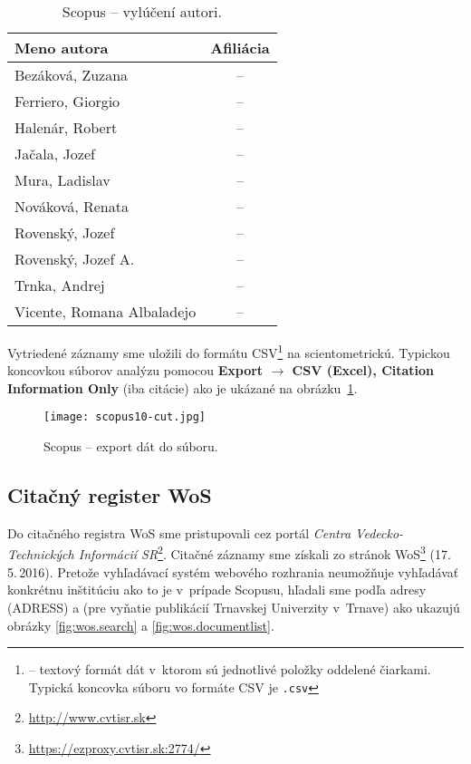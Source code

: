 \begin{table}
\centering\small
\begin{tabular}{lc}
  \hline\noalign{\vspace{.3ex}}
  Meno autora                & Afiliácia \\[0.3ex]
  \hline\noalign{\vspace{.5ex}}
  Bezáková, Zuzana           & -- \\
  Ferriero, Giorgio          & -- \\
  Halenár, Robert            & -- \\
  Jačala, Jozef              & -- \\
  Mura, Ladislav             & -- \\[1ex]
  Nováková, Renata           & -- \\
  Rovenský, Jozef            & -- \\
  Rovenský, Jozef A.         & -- \\
  Trnka, Andrej              & -- \\
  Vicente, Romana Albaladejo & -- \\[0.5ex]
  \hline
\end{tabular}
\caption{Scopus -- vylúčení autori.}
\label{tab:scopus.exauthors}
\end{table}

Vytriedené záznamy sme uložili do formátu CSV\footnote{ -- textový formát dát v~ktorom sú jednotlivé položky oddelené
  čiarkami.  Typická koncovka súboru vo formáte CSV je \texttt{.csv}} na
scientometrickú.  Typickou koncovkou súborov analýzu pomocou \textbf{Export
  $\rightarrow$ CSV (Excel), Citation Information Only} (iba citácie) ako je
ukázané na obrázku~\ref{fig:scopus.export}.

\begin{figure}
  \centering
  \texttt{[image: scopus10-cut.jpg]}
  \caption{Scopus -- export dát do súboru.}
  \label{fig:scopus.export}
\end{figure}


\subsection{Citačný register WoS}

Do citačného registra WoS sme pristupovali cez portál \emph{Centra
  Vedecko-Technických Informácií SR}\footnote{\url{http://www.cvtisr.sk}}.
Citačné záznamy sme získali zo stránok
WoS\footnote{\url{https://ezproxy.cvtisr.sk:2774/}} (17.\,5.\,2016).  Pretože
vyhľadávací systém webového rozhrania neumožňuje vyhľadávať konkrétnu inštitúciu
ako to je v~prípade Scopusu, hľadali sme podľa adresy (ADRESS)  a
 (pre vyňatie publikácií Trnavskej Univerzity v~Trnave) ako
ukazujú obrázky \ref{fig:wos.search} a \ref{fig:wos.documentlist}.


